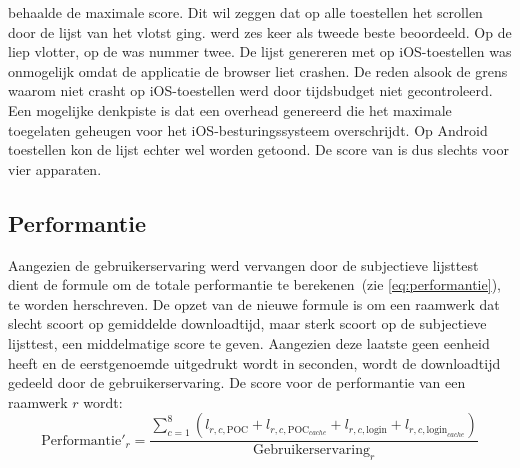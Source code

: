 \st{} behaalde de maximale score.
Dit wil zeggen dat op alle toestellen het scrollen door de lijst van \st{} het vlotst ging.
\jqm{} werd zes keer als tweede beste beoordeeld. 
Op de \htc{} liep \kendo{} vlotter,  op de \ipadi{} was \lungo{} nummer twee.
De lijst genereren met \kendo{} op iOS-toestellen was onmogelijk omdat de applicatie de browser liet crashen.
De reden alsook de grens waarom \kendo{} niet crasht op iOS-toestellen werd door tijdsbudget niet gecontroleerd.
Een mogelijke denkpiste is dat \kendo{} een overhead genereerd die het maximale toegelaten geheugen voor het iOS-besturingssysteem overschrijdt.
Op Android toestellen kon de \kendo{} lijst echter wel worden getoond.
De score van \kendo{} is dus slechts voor vier apparaten.



\subsection{Performantie}
\label{sec:evaluatie-performantie-besluit}

Aangezien de gebruikerservaring werd vervangen door de subjectieve lijsttest dient de formule om de totale performantie te berekenen~(zie \ref{eq:performantie}), te worden herschreven.
De opzet van de nieuwe formule is om een raamwerk dat slecht scoort op gemiddelde downloadtijd, maar sterk scoort op de subjectieve lijsttest, een middelmatige score te geven.
Aangezien deze laatste geen eenheid heeft en de eerstgenoemde uitgedrukt wordt in seconden, wordt de downloadtijd gedeeld door de gebruikerservaring. De score voor de performantie van een raamwerk $r$ wordt:
\begin{equation}
  \text{Performantie}'_r = \frac{\sum_{c=1}^{8}{\left(l_{r,c,\text{POC}}+l_{r,c,\text{POC}_{cache}}+l_{r,c,\text{login}}+l_{r,c,\text{login}_{cache}}\right)}}{\text{Gebruikerservaring}_r}
  \label{eq:performantie-enhanced}
\end{equation}

\begin{table}[H]
\centering
{}
\caption{Overzicht van performantie voor \st{}~(\sta), \kendo{}~(\kendoa), \jqm{}~(\jqma) en \lungo{}~(\lungoa). Minder is beter.}
\label{tabel:evaluatie-performantie}
\end{table}

